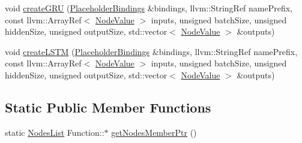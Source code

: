 \begin{Indent}
\begin{DoxyCompactItemize}
void \hyperlink{classglow_1_1_function_a38073ffa1c63421716ee236d56178738}{create\+G\+RU} (\hyperlink{classglow_1_1_placeholder_bindings}{Placeholder\+Bindings} \&bindings, llvm\+::\+String\+Ref name\+Prefix, const llvm\+::\+Array\+Ref$<$ \hyperlink{structglow_1_1_node_value}{Node\+Value} $>$ inputs, unsigned batch\+Size, unsigned hidden\+Size, unsigned output\+Size, std\+::vector$<$ \hyperlink{structglow_1_1_node_value}{Node\+Value} $>$ \&outputs)
\item 
void \hyperlink{classglow_1_1_function_a031dffcebc9798d481beaefaa927db61}{create\+L\+S\+TM} (\hyperlink{classglow_1_1_placeholder_bindings}{Placeholder\+Bindings} \&bindings, llvm\+::\+String\+Ref name\+Prefix, const llvm\+::\+Array\+Ref$<$ \hyperlink{structglow_1_1_node_value}{Node\+Value} $>$ inputs, unsigned batch\+Size, unsigned hidden\+Size, unsigned output\+Size, std\+::vector$<$ \hyperlink{structglow_1_1_node_value}{Node\+Value} $>$ \&outputs)
\end{DoxyCompactItemize}
\end{Indent}
\subsection*{Static Public Member Functions}
\begin{DoxyCompactItemize}
\item 
static \hyperlink{namespaceglow_a4919b7ef01548e927f0a5acb3a7400b9}{Nodes\+List} Function\+::$\ast$ \hyperlink{classglow_1_1_function_aa766431c358524e3dfeafc66d1cdcb4f}{get\+Nodes\+Member\+Ptr} ()
\end{DoxyCompactItemize}
